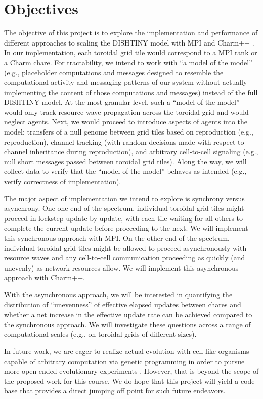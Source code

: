 \section{Objectives}

The objective of this project is to explore the implementation and performance of different approaches to scaling the DISHTINY model with MPI and Charm++ \cite{kale1993charm++, Forum:1994:MMI:898758}.
In our implementation, each toroidal grid tile would correspond to a MPI rank or a Charm chare.
For tractability, we intend to work with ``a model of the model'' (e.g., placeholder computations and messages designed to resemble the computational activity and messaging patterns of our system without actually implementing the content of those computations and messages) instead of the full DISHTINY model.
At the most granular level, such a ``model of the model'' would only track resource wave propagation across the toroidal grid and would neglect agents.
Next, we would proceed to introduce aspects of agents into the model: transfers of a null genome between grid tiles based on reproduction (e.g., reproduction), channel tracking (with random decisions made with respect to channel inheritance during reproduction), and arbitrary cell-to-cell signaling (e.g., null short messages passed between toroidal grid tiles).
Along the way, we will collect data to verify that the ``model of the model'' behaves as intended (e.g., verify correctness of implementation).

The major aspect of implementation we intend to explore is synchrony versus asynchrony.
One one end of the spectrum, individual toroidal grid tiles might proceed in lockstep update by update, with each tile waiting for all others to complete the current update before proceeding to the next.
We will implement this synchronous approach with MPI.
On the other end of the spectrum, individual toroidal grid tiles might be allowed to proceed asynchronously with resource waves and any cell-to-cell communication proceeding as quickly (and unevenly) as network resources allow.
We will implement this asynchronous approach with Charm++.

With the asynchronous approach, we will be interested in quantifying the distribution of ``unevenness'' of effective elapsed updates between chares and whether a net increase in the effective update rate can be achieved compared to the synchronous approach.
We will investigate these questions across a range of computational scales (e.g., on toroidal grids of different sizes).

In future work, we are eager to realize actual evolution with cell-like organisms capable of arbitrary computation via genetic programming in order to pursue more open-ended evolutionary experiments \cite{lalejini2018evolving}.
However, that is beyond the scope of the proposed work for this course.
We do hope that this project will yield a code base that provides a direct jumping off point for such future endeavors.
